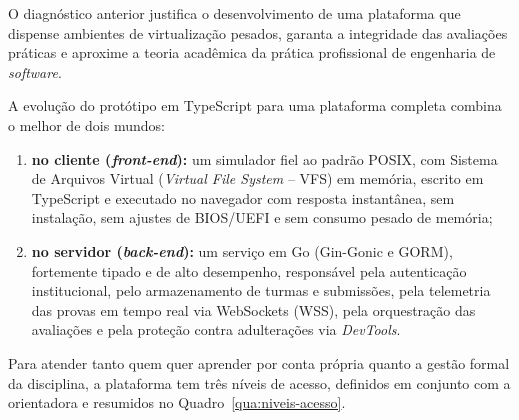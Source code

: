 O diagnóstico anterior justifica o desenvolvimento de uma plataforma que dispense ambientes de virtualização pesados, garanta a integridade das avaliações práticas e aproxime a teoria acadêmica da prática profissional de engenharia de \textit{software}.

A evolução do protótipo em TypeScript para uma plataforma completa combina o melhor de dois mundos:

\begin{enumerate}
    \item \textbf{no cliente (\textit{front-end}):} um simulador fiel ao padrão POSIX, com Sistema de Arquivos Virtual (\textit{Virtual File System} -- VFS) em memória, escrito em TypeScript e executado no navegador com resposta instantânea, sem instalação, sem ajustes de BIOS/UEFI e sem consumo pesado de memória;
    \item \textbf{no servidor (\textit{back-end}):} um serviço em Go (Gin-Gonic e GORM), fortemente tipado e de alto desempenho, responsável pela autenticação institucional, pelo armazenamento de turmas e submissões, pela telemetria das provas em tempo real via WebSockets (WSS), pela orquestração das avaliações e pela proteção contra adulterações via \textit{DevTools}.
\end{enumerate}

Para atender tanto quem quer aprender por conta própria quanto a gestão formal da disciplina, a plataforma tem três níveis de acesso, definidos em conjunto com a orientadora e resumidos no Quadro~\ref{qua:niveis-acesso}.

